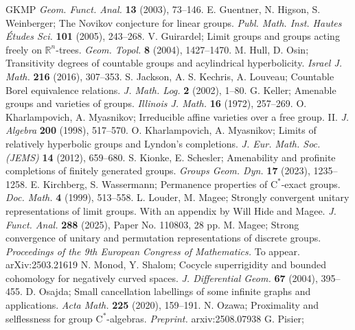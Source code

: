 \documentclass[12pt,nosumlimits,nonamelimits]{amsart}
\theoremstyle{remark}
\theoremstyle{definition}
\begin{document}
\begin{thebibliography}{GKMP}
\emph{Geom. Funct. Anal.} \textbf{13} (2003), 73--146.
%
 E. Guentner, N. Higson, S. Weinberger;
The Novikov conjecture for linear groups. 
\emph{Publ. Math. Inst. Hautes \'{E}tudes Sci.} \textbf{101} (2005), 243--268.
%
 V. Guirardel; 
Limit groups and groups acting freely on $\mathbb{R}^n$-trees.
\emph{Geom. Topol.} \textbf{8} (2004), 1427--1470.
%
 M. Hull, D. Osin; 
Transitivity degrees of countable groups and acylindrical hyperbolicity. 
\emph{Israel J. Math.} \textbf{216} (2016), 307--353. 
%
 S. Jackson, A. S. Kechris, A. Louveau; 
Countable Borel equivalence relations. 
\emph{J. Math. Log.} \textbf{2} (2002), 1--80.
%
 G. Keller;
Amenable groups and varieties of groups.
\emph{Illinois J. Math.} \textbf{16} (1972), 257--269.
%
 O. Kharlampovich, A. Myasnikov;
Irreducible affine varieties over a free group. II. 
\emph{J. Algebra} \textbf{200} (1998), 517--570.
%
 O. Kharlampovich, A. Myasnikov;
Limits of relatively hyperbolic groups and Lyndon's completions. 
\emph{J. Eur. Math. Soc. (JEMS)} \textbf{14} (2012), 659--680.
%
 S. Kionke, E. Schesler;
Amenability and profinite completions of finitely generated groups. 
\emph{Groups Geom. Dyn.} \textbf{17} (2023), 1235--1258.
%
 E. Kirchberg, S. Wassermann; 
Permanence properties of $\mathrm{C}^*$-exact groups. 
\emph{Doc. Math.} \textbf{4} (1999), 513–558. 
%
%
 L. Louder, M. Magee;
Strongly convergent unitary representations of limit groups. 
With an appendix by Will Hide and Magee.
\emph{J. Funct. Anal.} \textbf{288} (2025), Paper No. 110803, 28 pp.
%
 M. Magee;
Strong convergence of unitary and permutation 
representations of discrete groups. 
\emph{Proceedings of the 9th European Congress of Mathematics.} 
To appear. arXiv:2503.21619
%
 N. Monod, Y. Shalom;
Cocycle superrigidity and bounded cohomology for negatively curved spaces.
\emph{J. Differential Geom.} \textbf{67} (2004), 395--455.
%
 D. Osajda; 
Small cancellation labellings of some infinite graphs and applications. \emph{Acta Math.} \textbf{225} (2020), 159--191. 
%
 N. Ozawa; 
Proximality and selflessness for group $\mathrm{C}^*$-alge\-bras.
\emph{Preprint.} arxiv:2508.07938
%
 G. Pisier; 

\end{thebibliography}
\end{document}
